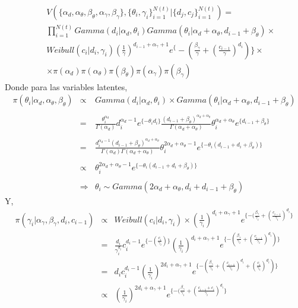 \begin{eqnarray*}
&&V(\{\alpha_d,\alpha_\theta,\beta_\theta,\alpha_\gamma,\beta_\gamma\},\{\theta_i,\gamma_i\}_{i=1}^{N(t)}|\{d_j,c_j\}_{i=1}^{N(t)})=\\ 
&&\prod_{i=1}^{N(t)} Gamma(d_i|\alpha_d,\theta_i) Gamma(\theta_i|\alpha_d+\alpha_\theta,d_{i-1}+\beta_\theta)\times \\
&&Weibull(c_i|d_i,\gamma_i)(\frac{1}{\gamma})^{d_{i-1}+\alpha_\gamma+1}e^\{-(\frac{\beta_\gamma}{\gamma}+(\frac{c_{i-1}}{\gamma})^{d_i})\} \times \\
&&\times \pi(\alpha_d)\pi(\alpha_\theta)\pi(\beta_\theta)\pi(\alpha_\gamma)\pi(\beta_\gamma)
\end{eqnarray*}
Donde para las variables latentes,
\begin{eqnarray*}
\pi(\theta_i|\alpha_d,\alpha_\theta,\beta_\theta)&\propto& Gamma(d_i|\alpha_d,\theta_i)\times Gamma(\theta_i|\alpha_d+\alpha_\theta,d_{i-1}+\beta_\theta)\\
\\
&=&\frac{\theta_i^{\alpha_d}}{\Gamma(\alpha_d)} d_i^{\alpha_d-1} e^{\{-\theta_id_i\}}\frac{(d_{i-1}+\beta_\theta)^{\alpha_d+\alpha_\theta}}{\Gamma(\alpha_d+\alpha_\theta)}\theta_i^{\alpha_d+\alpha_\theta}e^{\{d_{i-1}+\beta_\theta\}}\\
\\
&=&\frac{d_i^{\alpha_d-1}(d_{i-1}+\beta_\theta)^{\alpha_d+\alpha_\theta}}{\Gamma(\alpha_d)\Gamma(\alpha_d+\alpha_\theta)} \theta_i^{2\alpha_d+\alpha_\theta-1}e^{\{-\theta_i(d_{i-1}+d_i+\beta_\theta)\}}\\
\\
&\propto& \theta_i^{2\alpha_d+\alpha_\theta-1}e^{\{-\theta_i(d_{i-1}+d_i+\beta_\theta)\}}\\
\\
&\Rightarrow& \theta_i \sim Gamma(2\alpha_d+\alpha_\theta,d_i+d_{i-1}+\beta_\theta)
\end{eqnarray*}
Y,
\begin{eqnarray*}
\pi(\gamma_i|\alpha_\gamma,\beta_\gamma,d_i,c_{i-1})&\propto& Weibull(c_i|d_i,\gamma_i)\times (\frac{1}{\gamma_i})^{d_i +\alpha_\gamma+1}e^{\{-(\frac{\beta_\gamma}{\gamma_i}+(\frac{c_{i-1}}{\gamma_i})^{d_i}\}}\\
&=&\frac{d_i}{\gamma_i^{d_i}}c_i^{d_i-1}e^{\{-(\frac{c_i}{\gamma_i})\}}(\frac{1}{\gamma_i})^{d_i+\alpha_\gamma+1}e^{\{-(\frac{\beta_\gamma}{\gamma_i}+(\frac{c_{i-1}}{\gamma_i})^{d_i})\}}\\
&=&d_i c_i^{d_i-1}(\frac{1}{\gamma_i})^{2d_i+\alpha_\gamma+1}e^{\{-(\frac{\beta_\gamma}{\gamma_i}+(\frac{c_{i-1}}{\gamma_i})^{d_i}+(\frac{c_i}{\gamma_i})^{d_i})\}}\\
&\propto&(\frac{1}{\gamma_i})^{2d_i+\alpha_\gamma+1}e^{\{-(\frac{\beta_\gamma}{\gamma_i}+(\frac{c_{i-1}+c_i}{\gamma_i})^{d_i}\}}
\end{eqnarray*}
